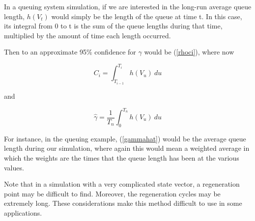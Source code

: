 In a queuing system simulation, if we are interested in the long-run
average queue length, $h(V_t)$ would simply be the length of the queue
at time t.  In this case, its integral from 0 to t is the sum of the
queue lengths during that time, multiplied by the amount of time each length
occurred.

Then to an approximate 95\% confidence for $\gamma$ would be
(\ref{rhoci}), where now

\begin{equation}
C_i = \int_{T_{i-1}}^{T_i} h(V_u) ~ du
\end{equation}

and 

\begin{equation}
\label{gammahat}
\hat{\gamma} = \frac{1}{T_n} \int_{0}^{T_n} h(V_u) ~ du
\end{equation}

For instance, in the queuing example, (\ref{gammahat}) would be the
average queue length during our simulation, where again this would mean
a weighted average in which the weights are the times that the queue
length has been at the various values.

Note that in a simulation with a very complicated state vector, a
regeneration point may be difficult to find.  Moreover, the regeneration
cycles may be extremely long.  These considerations make this method
difficult to use in some applications. 

